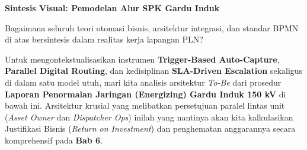 \documentclass[12pt,a4paper]{report}
\begin{document}
\textbf{Sintesis Visual: Pemodelan Alur SPK Gardu Induk} \par
Bagaimana seluruh teori otomasi bisnis, arsitektur integrasi, dan standar BPMN di atas bersintesis dalam realitas kerja lapangan PLN? 

Untuk mengontekstualisasikan instrumen \textbf{Trigger-Based Auto-Capture}, \textbf{Parallel Digital Routing}, dan kedisiplinan \textbf{SLA-Driven Escalation} sekaligus di dalam satu model utuh, mari kita analisis arsitektur \textit{To-Be} dari prosedur \textbf{Laporan Penormalan Jaringan (Energizing) Gardu Induk 150 kV} di bawah ini. Arsitektur krusial yang melibatkan persetujuan paralel lintas unit (\textit{Asset Owner} dan \textit{Dispatcher Ops}) inilah yang nantinya akan kita kalkulasikan Justifikasi Bisnis (\textit{Return on Investment}) dan penghematan anggarannya secara komprehensif pada \textbf{Bab 6}.
\end{document}

